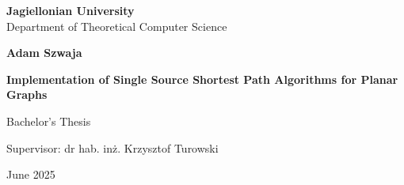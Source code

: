 \begin{titlepage}
	\begin{center}
        
		\large
		\textbf{Jagiellonian University}\\
		Department of Theoretical Computer Science\\

		\vspace{1.5cm}

		\Large
		\textbf{Adam Szwaja}

		\vspace*{2cm}

		\textbf{\LARGE Implementation of Single Source Shortest Path Algorithms for Planar Graphs}
		
		\vspace{0.5cm}
		\large
		
		\vfill
		\Large
		Bachelor's Thesis

		\vfill
		\Large
		Supervisor: dr hab. in\.z. Krzysztof Turowski
		
		\vspace{0.8cm}
		
		June 2025
		
\end{center}
\end{titlepage}
